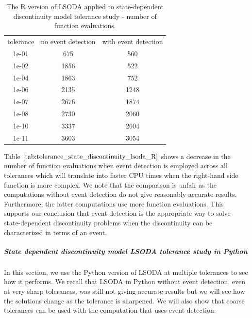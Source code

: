 \begin{table}[h]
\caption {The R version of LSODA applied to state-dependent discontinuity model tolerance study - number of function evaluations.} \label{tab:tolerance_state_discontinuity_lsoda_R} 
\begin{center}
\begin{tabular}{ c c c }
tolerance & no event detection & with event detection \\
1e-01 & 675 & 560 \\
1e-02 & 1856 & 522 \\
1e-04 & 1863 & 752 \\
1e-06 & 2135 & 1248 \\
1e-07 & 2676 & 1874 \\
1e-08 & 2730 & 2060 \\
1e-10 & 3337 & 2604 \\
1e-11 & 3603 & 3054 \\
\end{tabular}
\end{center}
\end{table}

Table $\ref{tab:tolerance_state_discontinuity_lsoda_R}$ shows a decrease in the number of function evaluations when event detection is employed across all tolerances which will translate into faster CPU times when the right-hand side function is more complex. We note that the comparison is unfair as the computations without event detection do not give reasonably accurate results. Furthermore, the latter computations use more function evaluations. This supports our conclusion that event detection is the appropriate way to solve state-dependent discontinuity problems when the discontinuity can be characterized in terms of an event.

\subparagraph{State dependent discontinuity model LSODA tolerance study in Python}
In this section, we use the Python version of LSODA at multiple tolerances to see how it performs. We recall that LSODA in Python without event detection, even at very sharp tolerances, was still not giving accurate results but we will see how the solutions change as the tolerance is sharpened. We will also show that coarse tolerances can be used with the computation that uses event detection. 

